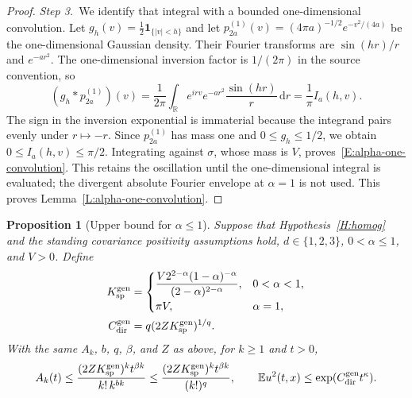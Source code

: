 \documentclass[12pt,oneside,openany]{book}
\makeatletter
\let\lean@pending\@empty
\newcommand{\LeanMarker}[1]{\gdef\lean@pending{#1}}
\numberwithin{equation}{section}
\newtheorem{proposition}[theorem]{Proposition}
\theoremstyle{nogostyle}
\theoremstyle{definition}
\newcommand{\R}{\mathbb{R}}
\newcommand{\E}{\mathbb{E}}
\newcommand{\ud}{\,\mathrm{d}}
\makeatother
\begin{document}
\begin{proof}
  \medskip
  \noindent\textit{Step 3.~}We identify that integral with a bounded
  one-dimensional convolution.
  Let $g_h(v) = \tfrac12\mathbf1_{\{|v|<h\}}$ and let $p_{2a}^{(1)}(v) = (4\pi
  a)^{-1/2}e^{-v^2/(4a)}$ be the one-dimensional Gaussian density. Their Fourier
  transforms are $\sin(hr)/r$ and $e^{-ar^2}$. The one-dimensional inversion
  factor is $1/(2\pi)$ in the source convention, so
  \[
    (g_h*p_{2a}^{(1)})(v)
    =\frac1{2\pi}\int_\R e^{irv}e^{-ar^2}
    \frac{\sin(hr)}r\ud r
    =\frac1\pi I_a(h,v).
  \]
  The sign in the inversion exponential is immaterial because the integrand
  pairs evenly under $r\mapsto-r$. Since $p_{2a}^{(1)}$ has mass one and $0 \le
  g_h \le 1/2$, we obtain $0 \le I_a(h,v) \le \pi/2$. Integrating against
  $\sigma$, whose mass is $V$, proves~\eqref{E:alpha-one-convolution}. This
  retains the oscillation until the one-dimensional integral is evaluated; the
  divergent absolute Fourier envelope at $\alpha = 1$ is not used. This proves
  Lemma~\ref{L:alpha-one-convolution}.
\end{proof}

\LeanMarker{P:low-alpha-upper}
\begin{proposition}[Upper bound for $\alpha \le 1$]\label{P:low-alpha-upper}
  Suppose that Hypothesis~\ref{H:homog} and the standing covariance positivity
  assumptions hold, $d \in \{1,2,3\}$, $0 < \alpha \le 1$, and $V > 0$. Define
  \begin{equation}\label{E:low-alpha-constants}
    \begin{split}
      K_{\rm sp}^{\rm gen}
      &=\begin{cases}
        \displaystyle\frac{V2^{2-\alpha}(1-\alpha)^{-\alpha}}
        {(2-\alpha)^{2-\alpha}},&0<\alpha<1,\\[2mm]
        \pi V,&\alpha=1,
      \end{cases}\\
      C_{\rm dir}^{\rm gen}&=q(2ZK_{\rm sp}^{\rm gen})^{1/q}.
    \end{split}
  \end{equation}
  With the same $A_k$, $b$, $q$, $\beta$, and $Z$ as above, for
  $k \ge 1$ and $t > 0$,
  \begin{equation}\label{E:low-alpha-coefficient}
    A_k(t)\le\frac{(2ZK_{\rm sp}^{\rm gen})^k t^{\beta k}}
    {k!\,k^{bk}}
    \le\frac{(2ZK_{\rm sp}^{\rm gen})^k t^{\beta k}}{(k!)^q},
    \qquad
    \E u^2(t,x)\le\exp(C_{\rm dir}^{\rm gen}t^\kappa).
  \end{equation}
\end{proposition}
\end{document}

